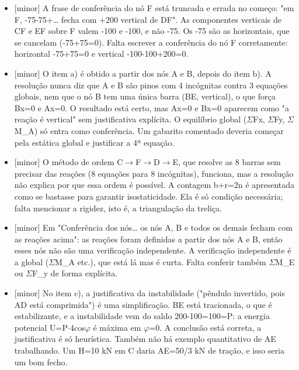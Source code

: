 \documentclass{article}%
\begin{document}
\begin{itemize}%
\item%
{[}minor{]} A frase de conferência do nó F está truncada e errada no começo: "em F, -75-75+\ldots{} fecha com +200 vertical de DF". As componentes verticais de CF e EF sobre F valem -100 e -100, e não -75. Os -75 são as horizontais, que se cancelam (-75+75=0). Falta escrever a conferência do nó F corretamente: horizontal -75+75=0 e vertical -100-100+200=0.%
\item%
{[}minor{]} O item a) é obtido a partir dos nós A e B, depois do item b). A resolução nunca diz que A e B são pinos com 4 incógnitas contra 3 equações globais, nem que o nó B tem uma única barra (BE, vertical), o que força Bx=0 e Ax=0. O resultado está certo, mas Ax=0 e Bx=0 aparecem como "a reação é vertical" sem justificativa explícita. O equilíbrio global ($\Sigma$Fx, $\Sigma$Fy, $\Sigma$M\_A) só entra como conferência. Um gabarito comentado deveria começar pela estática global e justificar a 4ª equação.%
\item%
{[}minor{]} O método de ordem C$\to$F$\to$D$\to$E, que resolve as 8 barras sem precisar das reações (8 equações para 8 incógnitas), funciona, mas a resolução não explica por que essa ordem é possível. A contagem b+r=2n é apresentada como se bastasse para garantir isostaticidade. Ela é só condição necessária; falta mencionar a rigidez, isto é, a triangulação da treliça.%
\item%
{[}minor{]} Em "Conferência dos nós\ldots{} os nós A, B e todos os demais fecham com as reações acima": as reações foram definidas a partir dos nós A e B, então esses nós não são uma verificação independente. A verificação independente é a global ($\Sigma$M\_A etc.), que está lá mas é curta. Falta conferir também $\Sigma$M\_E ou $\Sigma$F\_y de forma explícita.%
\item%
{[}minor{]} No item c), a justificativa da instabilidade ("pêndulo invertido, pois AD está comprimida") é uma simplificação. BE está tracionada, o que é estabilizante, e a instabilidade vem do saldo 200-100=100=P: a energia potencial U=P$\cdot$4cos$\varphi$ é máxima em $\varphi$=0. A conclusão está correta, a justificativa é só heurística. Também não há exemplo quantitativo de AE trabalhando. Um H=10 kN em C daria AE=50/3 kN de tração, e isso seria um bom fecho.%
\end{itemize}%
\end{document}

